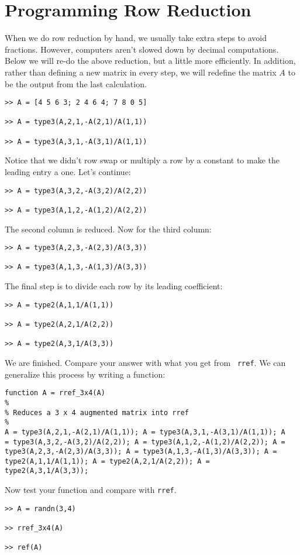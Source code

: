 \section*{Programming Row Reduction}

When we do row reduction by hand, we usually take extra steps to
avoid fractions.  However, computers aren't slowed down by decimal
computations.  Below we will re-do the above reduction, but a little
more efficiently.  In addition, rather than defining a new matrix in
every step, we will redefine the matrix $A$ to be the output from
the last calculation.
\begin{verbatim}
>> A = [4 5 6 3; 2 4 6 4; 7 8 0 5]

>> A = type3(A,2,1,-A(2,1)/A(1,1))

>> A = type3(A,3,1,-A(3,1)/A(1,1))
\end{verbatim}
Notice that we didn't row swap or multiply a row by a constant to
make the leading entry a one.  Let's continue:
\begin{verbatim}
>> A = type3(A,3,2,-A(3,2)/A(2,2))

>> A = type3(A,1,2,-A(1,2)/A(2,2))
\end{verbatim}
The second column is reduced.  Now for the third column:
\begin{verbatim}
>> A = type3(A,2,3,-A(2,3)/A(3,3))

>> A = type3(A,1,3,-A(1,3)/A(3,3))
\end{verbatim}
The final step is to divide each row by its leading coefficient:
\begin{verbatim}
>> A = type2(A,1,1/A(1,1))

>> A = type2(A,2,1/A(2,2))

>> A = type2(A,3,1/A(3,3))
\end{verbatim}
We are finished.  Compare your answer with what you get from {\tt
rref}.  We can generalize this process by writing a function:
\begin{verbatim}
function A = rref_3x4(A)
%
% Reduces a 3 x 4 augmented matrix into rref
%
A = type3(A,2,1,-A(2,1)/A(1,1)); A = type3(A,3,1,-A(3,1)/A(1,1)); A
= type3(A,3,2,-A(3,2)/A(2,2)); A = type3(A,1,2,-A(1,2)/A(2,2)); A =
type3(A,2,3,-A(2,3)/A(3,3)); A = type3(A,1,3,-A(1,3)/A(3,3)); A =
type2(A,1,1/A(1,1)); A = type2(A,2,1/A(2,2)); A =
type2(A,3,1/A(3,3));

\end{verbatim}
Now test your function and compare with {\tt rref}.
\begin{verbatim}
>> A = randn(3,4)

>> rref_3x4(A)

>> ref(A)
\end{verbatim}

